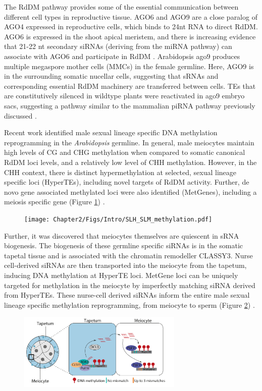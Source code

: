 The RdDM pathway provides some of the essential communication between different cell types in reproductive tissue. AGO6 and AGO9 are a close paralog of AGO4 expressed in reproductive cells, which binds to 24nt RNA to direct RdDM. AGO6 is expressed in the shoot apical meristem, and there is increasing evidence that 21-22 nt secondary siRNAs (deriving from the miRNA pathway) can associate with AGO6 and participate in RdDM \cite{RN133,RN61,RN33}. Arabidopsis ago9 produces multiple megaspore mother cells (MMCs) in the female germline. Here, AGO9 is in the surrounding somatic nucellar cells, suggesting that sRNAs and corresponding essential RdDM machinery are transferred between cells.  TEs that are constitutively silenced in wildtype plants were reactivated in ago9 embryo sacs, suggesting a pathway similar to the mammalian piRNA pathway previously discussed \cite{RN14}.

Recent work identified male sexual lineage specific DNA methylation reprogramming in the \textit{Arabidopsis} germline. In general, male meiocytes maintain high levels of CG and CHG methylation when compared to somatic canonical RdDM loci levels, and a relatively low level of CHH methylation. However, in the CHH context, there is distinct hypermethylation at selected, sexual lineage specific loci (HyperTEs), including novel targets of RdDM activity. Further, de novo gene associated methylated loci were also identified (MetGenes), including a meiosis specific gene (Figure \ref{fig:SLH_SLM}) \cite{RN199}.

\begin{figure}[htbp!] 
\centering    
    \texttt{[image: Chapter2/Figs/Intro/SLH\_SLM\_methylation.pdf]}
\caption{}
\label{fig:SLH_SLM}
\captionsetup{font=small}
    \caption*{}
\end{figure}

Further, it was discovered that meiocytes themselves are quiescent in sRNA biogenesis. The biogenesis of these germline specific siRNAs is in the somatic tapetal tissue and is associated with the chromatin remodeller CLASSY3. Nurse cell-derived siRNAs are then transported into the meiocyte from the tapetum, inducing DNA methylation at HyperTE loci. MetGene loci can be uniquely targeted for methylation in the meiocyte by imperfectly matching siRNA derived from HyperTEs. These nurse-cell derived siRNAs inform the entire male sexual lineage specific methylation reprogramming, from meiocyte to sperm (Figure \ref{fig:Jincheng_abstract}) \cite{RN187}.

\begin{figure}[htbp!] 
\centering    
        \includegraphics[width=0.7\textwidth]{Chapter2/Figs/Intro/Jincheng_paper_abstract.pdf}
\caption{}
\label{fig:Jincheng_abstract}
\captionsetup{font=small}
    \caption*{}
\end{figure}
\clearpage

